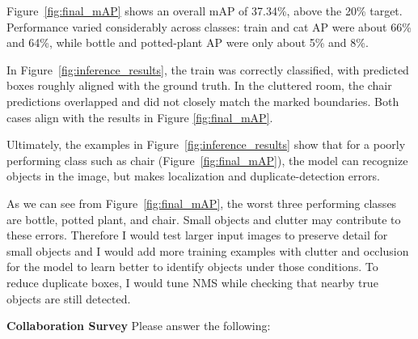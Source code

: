 \begin{itemize}
\begin{itemize}
\begin{solution}
Figure~\ref{fig:final_mAP} shows an overall mAP of 37.34\%, above the 20\%
target. Performance varied considerably across classes: train and cat AP
were about 66\% and 64\%, while bottle and potted-plant AP were only about
5\% and 8\%.

In Figure~\ref{fig:inference_results}, the train was correctly classified,
with predicted boxes roughly aligned with the ground truth. In the
cluttered room, the chair predictions overlapped and did not closely match
the marked boundaries. Both cases align with the results in Figure \ref{fig:final_mAP}. 

Ultimately, the examples in Figure~\ref{fig:inference_results} show that for a poorly performing class such as chair (Figure~\ref{fig:final_mAP}), the model can recognize objects in the image, but makes localization and duplicate-detection errors.

As we can see from Figure~\ref{fig:final_mAP}, the worst three performing classes are bottle, potted plant, and chair. Small objects and clutter may contribute to these errors. Therefore I would test larger input images to preserve detail for small objects and
I would add more training examples with clutter and occlusion for the model to learn better to identify objects under those conditions. To reduce duplicate
boxes, I would tune NMS while checking that nearby true objects are still
detected.
\end{solution}

    \end{itemize}
\end{itemize}

\clearpage

\textbf{Collaboration Survey} Please answer the following:

